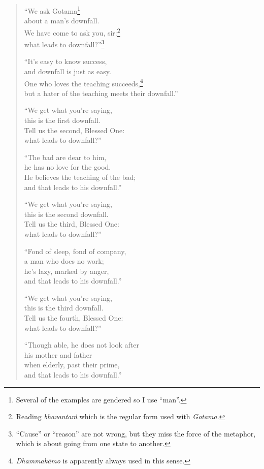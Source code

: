 \documentclass[12pt,openany]{book}%
\begin{document}
\begin{verse}%
“We ask Gotama\footnote{Several of the examples are gendered so I use “man”. } \\
about a man’s downfall. \\
We have come to ask you, sir:\footnote{Reading \textit{\textsanskrit{bhavantaṁ}} which is the regular form used with \textit{Gotama}. } \\
what leads to downfall?”\footnote{“Cause” or “reason” are not wrong, but they miss the force of the metaphor, which is about going from one state to another. } 

“It’s easy to know success, \\
and downfall is just as easy. \\
One who loves the teaching succeeds,\footnote{\textit{\textsanskrit{Dhammakāmo}} is apparently always used in this sense. } \\
but a hater of the teaching meets their downfall.” 

“We get what you’re saying, \\
this is the first downfall. \\
Tell us the second, Blessed One: \\
what leads to downfall?” 

“The bad are dear to him, \\
he has no love for the good. \\
He believes the teaching of the bad; \\
and that leads to his downfall.” 

“We get what you’re saying, \\
this is the second downfall. \\
Tell us the third, Blessed One: \\
what leads to downfall?” 

“Fond of sleep, fond of company, \\
a man who does no work; \\
he’s lazy, marked by anger, \\
and that leads to his downfall.” 

“We get what you’re saying, \\
this is the third downfall. \\
Tell us the fourth, Blessed One: \\
what leads to downfall?” 

“Though able, he does not look after \\
his mother and father \\
when elderly, past their prime, \\
and that leads to his downfall.” 


\end{verse}
\end{document}
